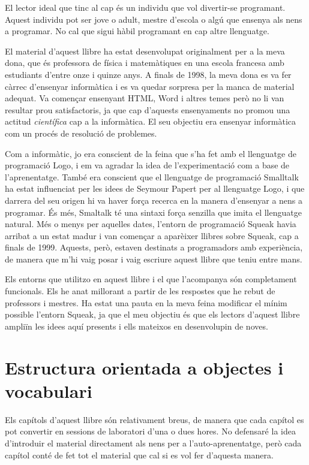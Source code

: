 El lector ideal que tinc al cap és un individu que vol divertir-se programant.
Aquest individu pot ser jove o adult, mestre d'escola o algú que ensenya als 
nens a programar. No cal que sigui hàbil programant en
cap altre llenguatge.

El material d'aquest llibre ha estat desenvolupat originalment per a la meva dona,
que és professora de física i matemàtiques en una escola francesa amb estudiants
d'entre onze i quinze anys. A finals de 1998, la meva dona es va fer càrrec 
d'ensenyar informàtica i es va quedar sorpresa per la manca de material adequat.
Va començar ensenyant HTML, Word i altres temes però no li van resultar
prou satisfactoris, ja que cap d'aquests ensenyaments no promou una 
actitud \textit{científica} cap a la informàtica. El seu objectiu era ensenyar 
informàtica com un procés de resolució de problemes.

Com a informàtic, jo era conscient de la feina que s'ha fet amb el llenguatge
de programació Logo, i em va agradar la idea de l'experimentació com a base de 
l'aprenentatge. També era conscient que el llenguatge de programació Smalltalk
ha estat influenciat per les idees de Seymour Papert per al llenguatge 
Logo, i que darrera del seu origen hi va haver força recerca en la manera d'ensenyar
a nens a programar. És més, Smaltalk té una sintaxi força senzilla que imita el
llenguatge natural. Més o menys per aquelles dates, l'entorn de programació 
Squeak havia arribat a un estat madur i van començar a aparèixer llibres sobre Squeak, cap a finals de 1999. Aquests, però, estaven destinats a programadors
amb experiència, de manera que m'hi vaig posar i vaig escriure aquest llibre que
teniu entre mans.

Els entorns que utilitzo en aquest llibre i el que l'acompanya són completament
funcionals. Els he anat millorant a partir de les respostes que he
rebut de professors i mestres. Ha estat una pauta en la meva feina 
modificar el mínim possible l'entorn Squeak, ja que el meu objectiu
és que els lectors d'aquest llibre ampliïn les idees aquí presents i ells
mateixos en desenvolupin de noves.

\section*{Estructura orientada a objectes i vocabulari}

Els capítols d'aquest llibre són relativament breus, de manera que cada 
capítol es pot convertir en sessions de laboratori d'una o dues hores.
No defensaré la idea d'introduir el material directament als nens per a l'auto-aprenentatge,
però cada capítol conté de fet tot el material que cal si es vol fer d'aquesta
manera.

